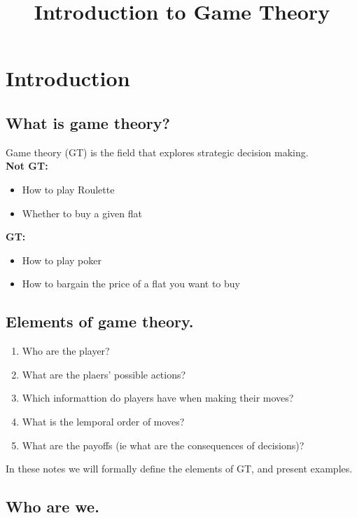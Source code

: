 \documentclass{article}
\title{Introduction to Game Theory}
\date{}
\begin{document}
\maketitle

\section{Introduction}

\subsection{What is game theory?}
Game theory (GT) is the field that explores strategic decision making. \\

\textbf{Not GT:}
\begin{itemize}
    \item How to play Roulette
    \item Whether to buy a given flat
\end{itemize}

\textbf{GT:}
\begin{itemize}
    \item How to play poker
    \item How to bargain the price of a flat you want to buy
\end{itemize}

\subsection{Elements of game theory.}

\begin{enumerate}
    \item Who are the player?
    \item What are the plaers' possible actions?
    \item Which informattion do players have when making their moves?
    \item What is the lemporal order of moves?
    \item What are the payoffs (ie what are the consequences of decisions)?
\end{enumerate}

In these notes we will formally define the elements of GT, and present examples.

\subsection{Who are we.}
\end{document}
